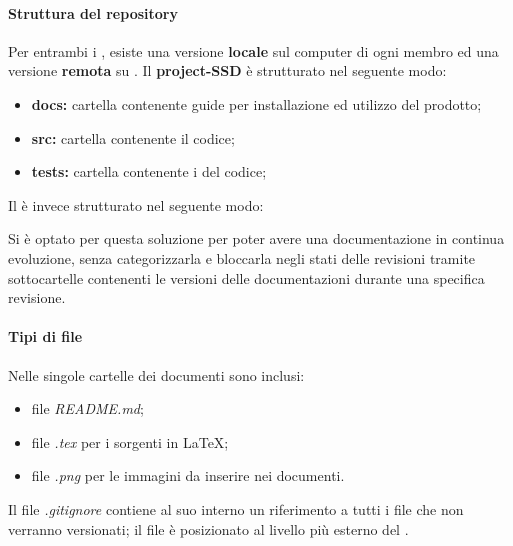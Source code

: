 {{\paragraph*{Struttura del repository}
Per entrambi i , esiste una versione \textbf{locale} sul computer di ogni membro ed una versione \textbf{remota} su \textit{}.\newline
Il  \textbf{project-SSD} è strutturato nel seguente modo:
\begin{itemize}
	\item \textbf{docs:} cartella contenente guide per installazione ed utilizzo del prodotto;
	\item \textbf{src:} cartella contenente il codice;
	\item \textbf{tests:} cartella contenente i  del codice;
\end{itemize}
Il  \textbf{\repoDoc{}} è invece strutturato nel seguente modo:
Si è optato per questa soluzione per poter avere una documentazione in continua evoluzione, senza categorizzarla e bloccarla negli stati delle revisioni tramite sottocartelle contenenti le versioni delle documentazioni durante una specifica revisione.
\paragraph*{Tipi di file}
Nelle singole cartelle dei documenti sono inclusi:
\begin{itemize}
\item file \textit{README.md};
\item file \textit{.tex} per i sorgenti in \LaTeX; 
\item file \textit{.png} per le immagini da inserire nei documenti.
\end{itemize}
Il file \textit{.gitignore} contiene al suo interno un riferimento a tutti i file che non verranno versionati; il file è posizionato al livello più esterno del .
}}
